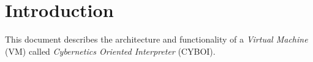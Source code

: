 %
%
%
%
%

\chapter{Introduction}
\label{introduction_heading}

This document describes the architecture and functionality of a
\emph{Virtual Machine} (VM) called \emph{Cybernetics Oriented Interpreter}
(CYBOI).

